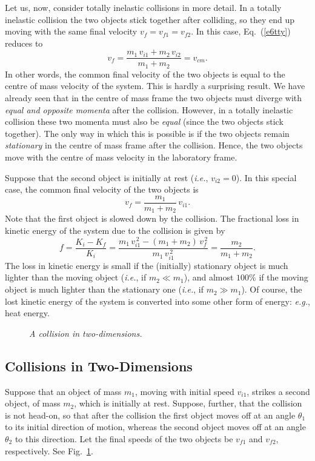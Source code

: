 Let us, now, consider totally inelastic collisions in more detail. In a totally inelastic
collision the two objects stick together after colliding, so they
 end up moving with the same final velocity 
$v_f= v_{f1}=v_{f2}$. In this case, Eq.~(\ref{e6tty}) reduces to
\begin{equation}
v_f = \frac{m_1\,v_{i1} + m_2\,v_{i2}}{m_1+m_2}= v_{cm}.
\end{equation}
In other words, the common final velocity of the two objects is equal to the
centre of mass velocity of the system. This is hardly a surprising result. We have already seen
that in the centre of mass frame the two objects must diverge with {\em equal and opposite momenta} after
the collision. However, in a totally inelastic collision these two momenta must
also be {\em equal} (since the two objects stick together). The only way in which this is possible
is if the two objects remain {\em stationary} in the centre of mass frame after the collision.
Hence, the two objects move with the centre of mass velocity in the laboratory frame.

Suppose that the second object is initially at rest ({\em i.e.}, $v_{i2}=0$). In this
special case, the common final velocity of the two objects is
\begin{equation}
v_f =  \frac{m_1}{m_1+m_2}\,v_{i1}.
\end{equation}
Note that the first object is slowed down by the collision.
The fractional loss in kinetic energy of the system due to the collision is given
by
\begin{equation}
f = \frac{K_i-K_f}{K_i} = \frac{m_1\,v_{i1}^{\,2} - (m_1+m_2)\,v_f^{\,2}}{m_1\,v_{i1}^{\,2}}
= \frac{m_2}{m_1+m_2}.
\end{equation}
The loss in kinetic energy is small if the (initially) stationary object
is much lighter than the  moving object ({\em i.e.}, if $m_2\ll m_1$), and almost $100\%$ if the moving
object is much lighter than the stationary one ({\em i.e.}, if $m_2\gg m_1$). 
Of course, the lost kinetic energy of the
system is converted into some other form of energy: {\em e.g.}, heat energy. 

\begin{figure}
\epsfysize=2.5in
\centerline{}
\caption{\em A collision in two-dimensions.}\label{f56}  
\end{figure}

\subsection{Collisions in Two-Dimensions}
Suppose that an object of mass $m_1$, moving with initial speed $v_{i1}$, strikes a
second object, of mass $m_2$, which is initially at rest. Suppose, further, that the collision
is not head-on, so that after the collision the first object moves off at an angle $\theta_1$ to
its initial direction of motion, whereas the second object moves off at an angle $\theta_2$ to
this direction. Let the final speeds of the two objects be
$v_{f1}$ and $v_{f2}$, respectively. See Fig.~\ref{f56}. 

